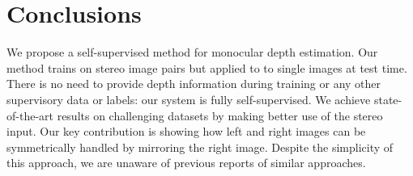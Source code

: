 \documentclass[10pt,twocolumn,letterpaper]{article}
\begin{document}
\begin{table}
	\centering
	\vspace{0.1in}
	\caption{{\bf Comparison on the Make3D dataset}: Our method generalizes well to the unseen Make3D dataset.
		Visually, our results are plausible and consistent. Please see figure~\ref{fig:make3d} for examples. Bold numbers are best scoring for supervised and self-supervised methods respectively.}
	\label{make3d}
\end{table}

\section{Conclusions}
We propose a self-supervised method for monocular depth estimation. Our method trains on stereo image pairs but applied to to single images at test time. There is no need to provide depth information during training or any other supervisory data or labels: our system is fully self-supervised. We achieve state-of-the-art results on challenging datasets by making better use of the stereo input. Our key contribution is showing how left and right images can be symmetrically handled by mirroring the right image. Despite the simplicity of this approach, we are unaware of previous reports of similar approaches.
\end{document}
